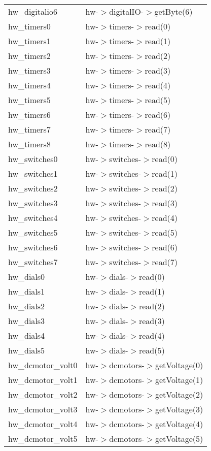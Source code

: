 \begin{center}
\begin{longtable}{|l|l|}
      hw\_digitalio6 & hw-$>$digitalIO-$>$getByte(6)\\
      hw\_timers0 & hw-$>$timers-$>$read(0)\\
      hw\_timers1 & hw-$>$timers-$>$read(1)\\
      hw\_timers2 & hw-$>$timers-$>$read(2)\\
      hw\_timers3 & hw-$>$timers-$>$read(3)\\
      hw\_timers4 & hw-$>$timers-$>$read(4)\\
      hw\_timers5 & hw-$>$timers-$>$read(5)\\
      hw\_timers6 & hw-$>$timers-$>$read(6)\\
      hw\_timers7 & hw-$>$timers-$>$read(7)\\
      hw\_timers8 & hw-$>$timers-$>$read(8)\\
      hw\_switches0 & hw-$>$switches-$>$read(0)\\
      hw\_switches1 & hw-$>$switches-$>$read(1)\\
      hw\_switches2 & hw-$>$switches-$>$read(2)\\
      hw\_switches3 & hw-$>$switches-$>$read(3)\\
      hw\_switches4 & hw-$>$switches-$>$read(4)\\
      hw\_switches5 & hw-$>$switches-$>$read(5)\\
      hw\_switches6 & hw-$>$switches-$>$read(6)\\
      hw\_switches7 & hw-$>$switches-$>$read(7)\\
      hw\_dials0 & hw-$>$dials-$>$read(0)\\
      hw\_dials1 & hw-$>$dials-$>$read(1)\\
      hw\_dials2 & hw-$>$dials-$>$read(2)\\
      hw\_dials3 & hw-$>$dials-$>$read(3)\\
      hw\_dials4 & hw-$>$dials-$>$read(4)\\
      hw\_dials5 & hw-$>$dials-$>$read(5)\\
      hw\_dcmotor\_volt0 & hw-$>$dcmotors-$>$getVoltage(0)\\
      hw\_dcmotor\_volt1 & hw-$>$dcmotors-$>$getVoltage(1)\\
      hw\_dcmotor\_volt2 & hw-$>$dcmotors-$>$getVoltage(2)\\
      hw\_dcmotor\_volt3 & hw-$>$dcmotors-$>$getVoltage(3)\\
      hw\_dcmotor\_volt4 & hw-$>$dcmotors-$>$getVoltage(4)\\
      hw\_dcmotor\_volt5 & hw-$>$dcmotors-$>$getVoltage(5)\\

\end{longtable}
\end{center}
